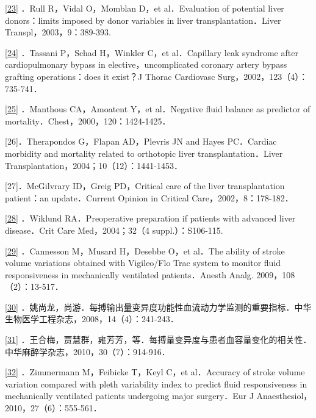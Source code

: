 \protect\hyperlink{text00020.htmlux5cux23ch23-19-back}{{[}23{]}} ．Rull
R，Vidal O，Momblan D，et al．Evaluation of potential liver
donors：limits imposed by donor variables in liver
transplantation．Liver Transpl，2003，9：389-393.

\protect\hyperlink{text00020.htmlux5cux23ch24-19-back}{{[}24{]}}
．Tassani P，Schad H，Winkler C，et al．Capillary leak syndrome after
cardiopulmonary bypass in elective，uncomplicated coronary artery bypass
grafting operations：does it exist？J Thorac Cardiovasc
Surg，2002，123（4）：735-741．

\protect\hyperlink{text00020.htmlux5cux23ch25-19-back}{{[}25{]}}
．Manthous CA，Amoatent Y，et al．Negative fluid balance as predictor of
mortality．Chest，2000，120：1424-1425．

{[}26{]}．Therapondos G，Flapan AD，Plevris JN and Hayes PC．Cardiac
morbidity and mortality related to orthotopic liver
transplantation．Liver Transplantation，2004；10（12）：1441-1453．

{[}27{]}．McGilvrary ID，Greig PD，Critical care of the liver
transplantation patient：an update．Current Opinion in Critical
Care，2002，8：178-182．

\protect\hyperlink{text00020.htmlux5cux23ch28-19-back}{{[}28{]}}
．Wiklund RA．Preoperative preparation if patients with advanced liver
disease．Crit Care Med，2004；32（4 suppl.）：S106-115.

\protect\hyperlink{text00020.htmlux5cux23ch29-19-back}{{[}29{]}}
．Cannesson M，Musard H，Desebbe O，et al．The ability of stroke volume
variations obtained with Vigileo/Flo Trac system to monitor fluid
responsiveness in mechanically ventilated patients．Anesth Analg.
2009，108（2）：13-517．

\protect\hyperlink{text00020.htmlux5cux23ch30-19-back}{{[}30{]}}
．姚尚龙，尚游．每搏输出量变异度功能性血流动力学监测的重要指标．中华生物医学工程杂志，2008，14（4）：241-243．

\protect\hyperlink{text00020.htmlux5cux23ch31-19-back}{{[}31{]}}
．王合梅，贾慧群，雍芳芳，等．每搏量变异度与患者血容量变化的相关性．中华麻醉学杂志，2010，30（7）：914-916．

\protect\hyperlink{text00020.htmlux5cux23ch32-19-back}{{[}32{]}}
．Zimmermann M，Feibicke T，Keyl C，et al．Accuracy of stroke volume
variation compared with pleth variability index to predict fluid
responsiveness in mechanically ventilated patients undergoing major
surgery．Eur J Anaesthesiol，2010，27（6）：555-561．

